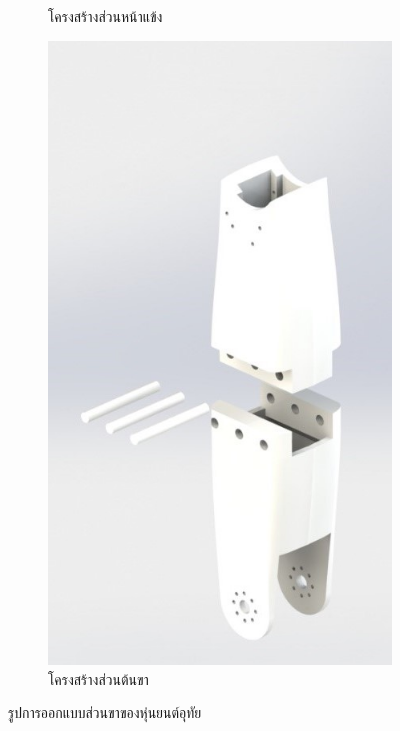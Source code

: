 \begin{figure}[h!]
\begin{subfigure}[b]{0.3\linewidth}
      \caption{โครงสร้างส่วนหน้าแข้ง}
    \end{subfigure}
    \begin{subfigure}[b]{0.35\linewidth}
      \includegraphics[width=\linewidth]{chapter4/images/thigh.jpg}
      \caption{โครงสร้างส่วนต้นขา}
    \end{subfigure}
    \caption{รูปการออกแบบส่วนขาของหุ่นยนต์อุทัย}
    \label{fig:leg}
  \end{figure}

